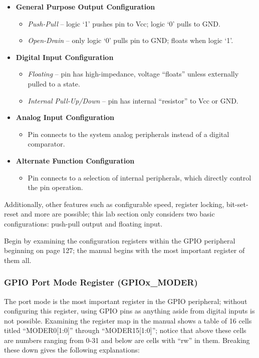 \documentclass[11pt,fleqn]{book} %
\begin{document}
\begin{itemize}
    \item \textbf{General Purpose Output Configuration}
    \begin{itemize}
        \item \textit{Push-Pull} -- logic `1' pushes pin to Vcc; logic `0' pulls to GND.
        \item \textit{Open-Drain} -- only logic `0' pulls pin to GND; floats when logic `1'.
    \end{itemize}
    \item \textbf{Digital Input Configuration}
    \begin{itemize}
        \item \textit{Floating} -- pin has high-impedance, voltage ``floats'' unless externally pulled to a state.
        \item \textit{Internal Pull-Up/Down} -- pin has internal ``resistor'' to Vcc or GND.
    \end{itemize}
    \item \textbf{Analog Input Configuration}
    \begin{itemize}
        \item Pin connects to the system analog peripherals instead of a digital comparator.
    \end{itemize}
    \item \textbf{Alternate Function Configuration}
    \begin{itemize}
        \item Pin connects to a selection of internal peripherals, which directly control the pin operation.
    \end{itemize}
\end{itemize} 

Additionally, other features such as configurable speed, register locking, bit-set-reset and more are possible; this lab section only considers two basic configurations: push-pull output and floating input.

Begin by examining the configuration registers within the GPIO peripheral beginning on page 127; the manual begins with the most important register of them all. 

\subsubsection{GPIO Port Mode Register (GPIOx\_MODER)}

The port mode is the most important register in the GPIO peripheral; without configuring this register, using GPIO pins as anything aside from digital inputs is not possible. Examining the register map in the manual shows a table of 16 cells titled ``MODER0[1:0]'' through ``MODER15[1:0]''; notice that above these cells are numbers ranging from 0-31 and below are cells with ``rw'' in them. Breaking these down gives the following explanations: 
\end{document}
